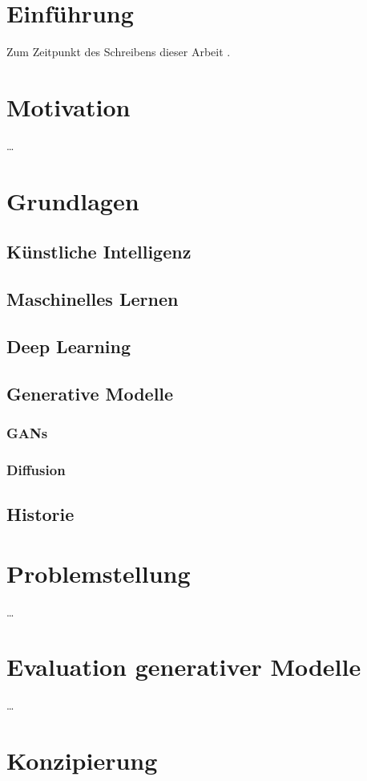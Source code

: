 \documentclass[12pt,a4paper]{article}
\begin{document}
\newpage
{}
\section{Einführung}
Zum Zeitpunkt des Schreibens dieser Arbeit \parencite[vgl.][]{assembly_in_dotnet}.

\section{Motivation}
\dots

\section{Grundlagen}
\subsection{Künstliche Intelligenz}
\subsection{Maschinelles Lernen}
\subsection{Deep Learning}
\subsection{Generative Modelle}
\subsubsection{GANs}
\subsubsection{Diffusion}
\subsection{Historie}

\section{Problemstellung}
\dots

\section{Evaluation generativer Modelle}
\dots

\section{Konzipierung}
\end{document}
